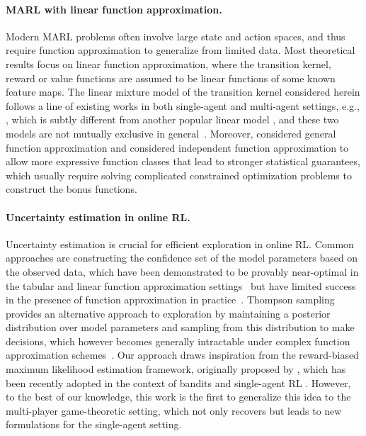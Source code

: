 \paragraph{MARL with linear function approximation.} Modern MARL problems often involve large state and action spaces, and thus require function approximation to generalize from limited data. Most theoretical results focus on linear function approximation, where the transition kernel, reward or value functions are assumed to be linear functions of some known feature maps. The linear mixture model of the transition kernel considered herein follows a line of existing works in both single-agent and multi-agent settings, e.g., \citet{ayoub2020model,chen2022almost,modi2020sample,jia2020model,chen2022almost,liu2024maximize}, which is subtly different from another popular linear model \citep{jin2020provably,wang2019optimism,yang2019sample,xie2020learning}, and these two models are not mutually exclusive in general~\citep{chen2022almost}. Moreover, \citet{ni2022representation,huang2022towards} considered general function approximation and \citet{cui2023breaking,wang2023breaking,dai2024refined} considered independent function approximation to allow more expressive function classes that lead to stronger statistical guarantees, which usually require solving complicated constrained optimization problems to construct the bonus functions. 

\paragraph{Uncertainty estimation in online RL.} Uncertainty estimation is crucial for efficient exploration in online RL. Common approaches are constructing the confidence set of the model parameters based on the observed data, which have been demonstrated to be provably near-optimal in the tabular and linear function approximation settings~\citep{jin2018q,agarwal2023vo} but have  limited success in the presence of function approximation in practice~\citep{gawlikowski2023survey}. Thompson sampling provides an alternative approach to exploration by maintaining a posterior distribution over model parameters and sampling from this distribution to make decisions, which however becomes generally intractable under complex function approximation schemes~\citep{russo2018tutorial}. Our approach draws inspiration from the reward-biased maximum likelihood estimation framework, originally proposed by \citet{kumar1982new}, which has been recently adopted in the context of bandits \citep{liu2020exploration,hung2021reward,cen2024value} and single-agent RL \citep{mete2021reward,liu2024maximize}. However, to the best of our knowledge, this work is the first to generalize this idea to the multi-player game-theoretic setting, which not only recovers but leads to new formulations for the single-agent setting.
